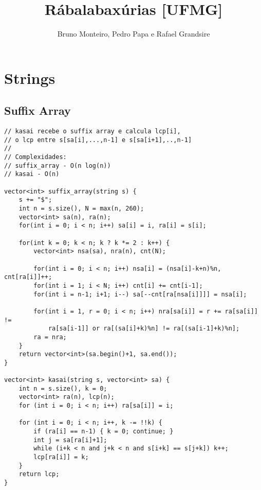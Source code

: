 \documentclass[12pt, a4paper, twoside]{article}
\title{Rábalabaxúrias [UFMG]}
\author{Bruno Monteiro, Pedro Papa e Rafael Grandsire}
\begin{document}
\twocolumn
\date{} %
\maketitle


\renewcommand{\contentsname}{Índice} %
\tableofcontents


%
%

\section{Strings}

\subsection{Suffix Array}
\begin{lstlisting}
// kasai recebe o suffix array e calcula lcp[i],
// o lcp entre s[sa[i],...,n-1] e s[sa[i+1],..,n-1]
//
// Complexidades:
// suffix_array - O(n log(n))
// kasai - O(n)

vector<int> suffix_array(string s) {
	s += "$";
	int n = s.size(), N = max(n, 260);
	vector<int> sa(n), ra(n);
	for(int i = 0; i < n; i++) sa[i] = i, ra[i] = s[i];

	for(int k = 0; k < n; k ? k *= 2 : k++) {
		vector<int> nsa(sa), nra(n), cnt(N);

		for(int i = 0; i < n; i++) nsa[i] = (nsa[i]-k+n)%n, cnt[ra[i]]++;
		for(int i = 1; i < N; i++) cnt[i] += cnt[i-1];
		for(int i = n-1; i+1; i--) sa[--cnt[ra[nsa[i]]]] = nsa[i];

		for(int i = 1, r = 0; i < n; i++) nra[sa[i]] = r += ra[sa[i]] !=
			ra[sa[i-1]] or ra[(sa[i]+k)%n] != ra[(sa[i-1]+k)%n];
		ra = nra;
	}
	return vector<int>(sa.begin()+1, sa.end());
}

vector<int> kasai(string s, vector<int> sa) {
	int n = s.size(), k = 0;
	vector<int> ra(n), lcp(n);
	for (int i = 0; i < n; i++) ra[sa[i]] = i;

	for (int i = 0; i < n; i++, k -= !!k) {
		if (ra[i] == n-1) { k = 0; continue; }
		int j = sa[ra[i]+1];
		while (i+k < n and j+k < n and s[i+k] == s[j+k]) k++;
		lcp[ra[i]] = k;
	}
	return lcp;
}
\end{lstlisting}
\end{document}
